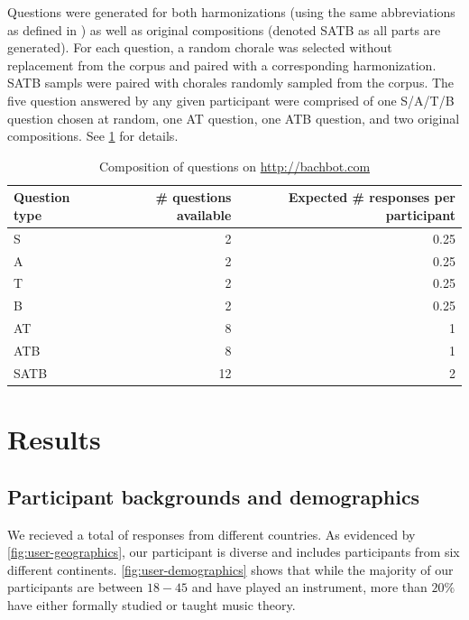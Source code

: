 Questions were generated for both harmonizations (using the same abbreviations
as defined in ) as well as original compositions (denoted SATB as all parts
are generated). For each question, a random chorale was selected without
replacement from the corpus and paired with a corresponding harmonization.
SATB sampls were paired with chorales randomly sampled from the corpus. The
five question answered by any given participant were comprised of one S/A/T/B
question chosen at random, one AT question, one ATB question, and two original
compositions. See \cref{tab:bachbot-com-question-distribtion} for details.

\begin{table}[tb]
  \centering
  \begin{tabular}{lrr}
    \toprule
    Question type & \# questions available & Expected \# responses per participant \\
    \midrule
    S        & 2  & 0.25 \\
    A        & 2  & 0.25 \\
    T        & 2  & 0.25 \\
    B        & 2  & 0.25 \\
    AT       & 8  & 1 \\
    ATB      & 8  & 1 \\
    SATB     & 12 & 2 \\
    \bottomrule
  \end{tabular}
  \caption{Composition of questions on \url{http://bachbot.com}}
  \label{tab:bachbot-com-question-distribtion}
\end{table}

\section{Results}

\subsection{Participant backgrounds and demographics}

We recieved a total of  responses from  different countries. As evidenced by \cref{fig:user-geographics},
our participant is diverse and includes participants from six different continents.
\cref{fig:user-demographics} shows that while the majority of our participants
are between $18-45$ and have played an instrument, more than $20\%$
have either formally studied or taught music theory.

